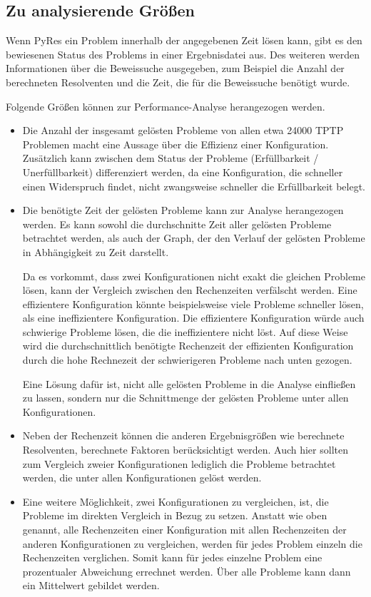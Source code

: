 	
	\subsection{Zu analysierende Größen}
	
	Wenn PyRes ein Problem innerhalb der angegebenen Zeit lösen kann, gibt es den bewiesenen Status des Problems in einer Ergebnisdatei aus. Des weiteren werden Informationen über die Beweissuche ausgegeben, zum Beispiel die Anzahl der berechneten Resolventen und die Zeit, die für die Beweissuche benötigt wurde.
	
	Folgende Größen können zur Performance-Analyse herangezogen werden.
	\begin{itemize}
		\item Die Anzahl der insgesamt gelösten Probleme von allen etwa 24000 TPTP Problemen macht eine Aussage über die Effizienz einer Konfiguration. Zusätzlich kann zwischen dem Status der Probleme (Erfüllbarkeit / Unerfüllbarkeit) differenziert werden, da eine Konfiguration, die schneller einen Widerspruch findet, nicht zwangsweise schneller die Erfüllbarkeit belegt.
		
		\item Die benötigte Zeit der gelösten Probleme kann zur Analyse herangezogen werden. Es kann sowohl die durchschnitte Zeit aller gelösten Probleme betrachtet werden, als auch der Graph, der den Verlauf der gelösten Probleme in Abhängigkeit zu Zeit darstellt.
		
		Da es vorkommt, dass zwei Konfigurationen nicht exakt die gleichen Probleme lösen, kann der Vergleich zwischen den Rechenzeiten verfälscht werden. Eine effizientere Konfiguration könnte beispielsweise viele Probleme schneller lösen, als eine ineffizientere Konfiguration. Die effizientere Konfiguration würde auch schwierige Probleme lösen, die die ineffizientere nicht löst. Auf diese Weise wird die durchschnittlich benötigte Rechenzeit der effizienten Konfiguration durch die hohe Rechnezeit der schwierigeren Probleme nach unten gezogen.
		
		Eine Lösung dafür ist, nicht alle gelösten Probleme in die Analyse einfließen zu lassen, sondern nur die Schnittmenge der gelösten Probleme unter allen Konfigurationen.
		
		\item Neben der Rechenzeit können die anderen Ergebnisgrößen wie berechnete Resolventen, berechnete Faktoren berücksichtigt werden. Auch hier sollten zum Vergleich zweier Konfigurationen lediglich die Probleme betrachtet werden, die unter allen Konfigurationen gelöst werden.
		
		\item Eine weitere Möglichkeit, zwei Konfigurationen zu vergleichen, ist, die Probleme im direkten Vergleich in Bezug zu setzen. Anstatt wie oben genannt, alle Rechenzeiten einer Konfiguration mit allen Rechenzeiten der anderen Konfigurationen zu vergleichen, werden für jedes Problem einzeln die Rechenzeiten verglichen. Somit kann für jedes einzelne Problem eine prozentualer Abweichung errechnet werden. Über alle Probleme kann dann ein Mittelwert gebildet werden.
	\end{itemize}
